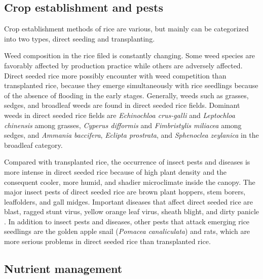 \subsection*{Crop establishment and pests}

Crop establishment methods of rice are various, but mainly can be categorized into two types, direct seeding and transplanting. 

Weed composition in the rice filed is constantly changing. Some weed species are favorably affected by production practice while others are adversely affected. Direct seeded rice  more possibly encounter with weed competition than transplanted rice, because they emerge simultaneously with rice seedlings because of the absence of flooding in the early stages. Generally, weeds such as grasses, sedges, and broadleaf weeds are found in direct seeded rice fields. Dominant weeds in direct seeded rice fields are \textit{Echinochloa crus-galli} and \textit{Leptochloa chinensis} among grasses, \textit{Cyperus difformis} and \textit{Fimbristylis miliacea} among sedges, and \textit{Ammania baccifera}, \textit{Eclipta prostrata}, and \textit{Sphenoclea zeylanica} in the broadleaf category.

Compared with transplanted rice, the occurrence of insect pests and diseases is more intense in direct seeded rice because of high plant density and the consequent cooler, more humid, and shadier microclimate inside the canopy. The major insect pests of direct seeded rice are brown plant hoppers, stem borers, leaffolders, and gall midges. Important diseases that affect direct seeded rice are blast, ragged stunt virus, yellow orange leaf virus, sheath blight, and dirty panicle \citep{pongprasert1995insect}. In addition to insect pests and diseases, other pests that attack emerging rice seedlings are the golden apple snail (\textit{Pomacea canaliculata}) and rats, which are more serious problems in direct seeded rice than transplanted rice. 


\subsection*{Nutrient management}

